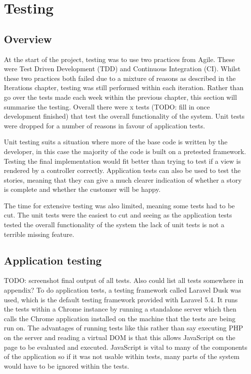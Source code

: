 \chapter{Testing}

\section{Overview}
At the start of the project, testing was to use two practices from Agile. These were Test Driven Development (TDD) and Continuous Integration (CI). Whilst these two practices both failed due to a mixture of reasons as described in the Iterations chapter, testing was still performed within each iteration. Rather than go over the tests made each week within the previous chapter, this section will summarise the testing. Overall there were x tests (TODO: fill in once development finished) that test the overall functionality of the system. Unit tests were dropped for a number of reasons in favour of application tests.

Unit testing suits a situation where more of the base code is written by the developer, in this case the majority of the code is built on a pretested framework. Testing the final implementation would fit better than trying to test if a view is rendered by a controller correctly. Application tests can also be used to test the stories, meaning that they can give a much clearer indication of whether a story is complete and whether the customer will be happy. 

The time for extensive testing was also limited, meaning some tests had to be cut. The unit tests were the easiest to cut and seeing as the application tests tested the overall functionality of the system the lack of unit tests is not a terrible missing feature. 

\section{Application testing}
TODO: screenshot final output of all tests. Also could list all tests somewhere in appendix?
To do application tests, a testing framework called Laravel Dusk was used, which is the default testing framework provided with Laravel 5.4\cite{dusk}\cite{dusk-desc}. It runs the tests within a Chrome instance by running a standalone server which then calls the Chrome application installed on the machine that the tests are being run on. The advantages of running tests like this rather than say executing PHP on the server and reading a virtual DOM is that this allows JavaScript on the page to be evaluated and executed. JavaScript is vital to many of the components of the application so if it was not usable within tests, many parts of the system would have to be ignored within the tests.


